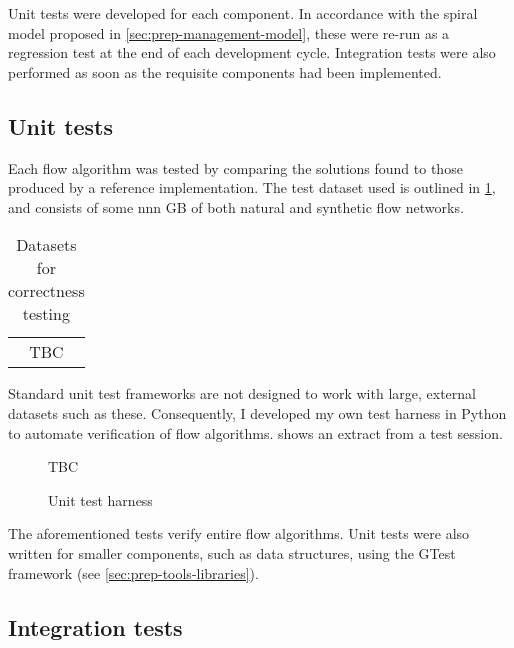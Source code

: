 
Unit tests were developed for each component. In accordance with the spiral model proposed in \cref{sec:prep-management-model}, these were re-run as a regression test at the end of each development cycle. Integration tests were also performed as soon as the requisite components had been implemented.

\subsection{Unit tests} \label{sec:eval-testing-unit}

Each flow algorithm was tested by comparing the solutions found to those produced by a reference implementation. The test dataset used is outlined in \cref{table:correctness-test-dataset}, and consists of some nnn GB of both natural and synthetic flow networks.

\begin{table}
    \begin{tabular}{c}
        TBC
    \end{tabular}
    \caption{Datasets for correctness testing}
    \label{table:correctness-test-dataset}
\end{table}

Standard unit test frameworks are not designed to work with large, external datasets such as these. Consequently, I developed my own test harness in Python to automate verification of flow algorithms.  shows an extract from a test session.

\begin{figure} 
    TBC
    \caption{Unit test harness}
    \label{fig:unit-test-harness}
\end{figure}

The aforementioned tests verify entire flow algorithms. Unit tests were also written for smaller components, such as data structures, using the GTest framework (see \cref{sec:prep-tools-libraries}).

\subsection{Integration tests} \label{sec:eval-test-integration}

